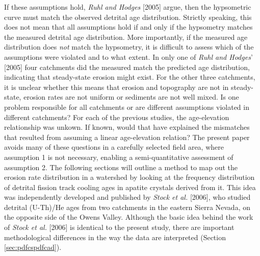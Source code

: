 \documentclass[12pt,twoside]{article}
\begin{document}
If these  assumptions hold, {\it  Ruhl and Hodges} [2005]  argue, then
the   hypsometric  curve   must  match   the  observed   detrital  age
distribution.   Strictly  speaking,  this   does  not  mean  that  all
assumptions hold  if and only  if the hypsometry matches  the measured
detrital  age distribution.   More  importantly, if  the measured  age
distribution does {\it  not} match the hypsometry, it  is difficult to
assess which of  the assumptions were violated and  to what extent. In
only  one of {\it  Ruhl and  Hodges}' [2005]  four catchments  did the
measured  match  the   predicted  age  distribution,  indicating  that
steady-state erosion might exist.   For the other three catchments, it
is unclear whether  this means that erosion and  topography are not in
steady-state, erosion rates are not  uniform or sediments are not well
mixed.  Is one problem responsible for all catchments or are different
assumptions  violated  in  different  catchments?   For  each  of  the
previous  studies,  the  age-elevation  relationship was  unkown.   If
known,  would that have  explained the  mismatches that  resulted from
assuming a  linear age-elevation  relation?  The present  paper avoids
many  of these  questions in  a carefully  selected field  area, where
assumption 1 is not necessary, enabling a semi-quantitative assessment
of assumption 2.  The following  sections will outline a method to map
out the  erosion rate  distribution in a  watershed by looking  at the
frequency  distribution  of detrital  fission  track  cooling ages  in
apatite  crystals  derived  from  it.   This  idea  was  independently
developed and  published by  {\it Stock et  al.}  [2006],  who studied
detrital  (U-Th)/He ages  from two  catchments in  the  eastern Sierra
Nevada, on the  opposite side of the Owens  Valley. Although the basic
idea behind the work of {\it Stock et al.}  [2006] is identical to the
present study,  there are important methodological  differences in the
way the data are interpreted (Section \ref{sec:pdfcspdfcad}).
\\
\end{document}
